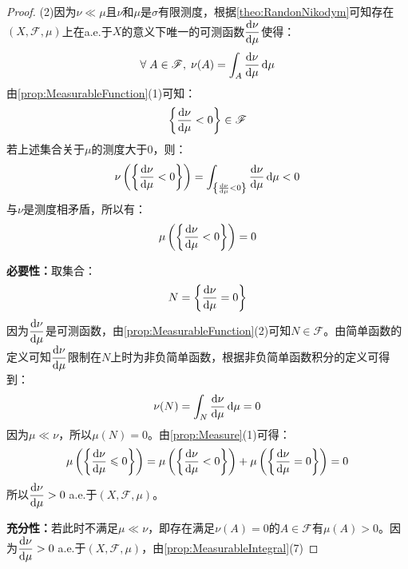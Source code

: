 \begin{proof}
	(2)因为$\nu\ll\mu$且$\nu$和$\mu$是$\sigma$有限测度，根据\cref{theo:RandonNikodym}可知存在$(X,\mathscr{F},\mu)$上在a.e.于$X$的意义下唯一的可测函数$\dfrac{\mathop{}\!\mathrm{d}\nu}{\mathop{}\!\mathrm{d}\mu}$使得：
	\begin{equation*}
		\forall\;A\in\mathscr{F},\;\nu(A)=\int_{A}\frac{\mathop{}\!\mathrm{d}\nu}{\mathop{}\!\mathrm{d}\mu}\mathop{}\!\mathrm{d}\mu
	\end{equation*}
	由\cref{prop:MeasurableFunction}(1)可知：
	\begin{equation*}
		\left\{\frac{\mathop{}\!\mathrm{d}\nu}{\mathop{}\!\mathrm{d}\mu}<0\right\}\in\mathscr{F}
	\end{equation*}
	若上述集合关于$\mu$的测度大于$0$，则：
	\begin{equation*}
		\nu\left(\left\{\frac{\mathop{}\!\mathrm{d}\nu}{\mathop{}\!\mathrm{d}\mu}<0\right\}\right)=\int_{\left\{\frac{\mathop{}\!\mathrm{d}\nu}{\mathop{}\!\mathrm{d}\mu}<0\right\}}\frac{\mathop{}\!\mathrm{d}\nu}{\mathop{}\!\mathrm{d}\mu}\mathop{}\!\mathrm{d}\mu<0
	\end{equation*}
	与$\nu$是测度相矛盾，所以有：
	\begin{equation*}
		\mu\left(\left\{\frac{\mathop{}\!\mathrm{d}\nu}{\mathop{}\!\mathrm{d}\mu}<0\right\}\right)=0
	\end{equation*}\par
	\textbf{必要性：}取集合：
	\begin{equation*}
		N=\left\{\frac{\mathop{}\!\mathrm{d}\nu}{\mathop{}\!\mathrm{d}\mu}=0\right\}
	\end{equation*}
	因为$\dfrac{\mathop{}\!\mathrm{d}\nu}{\mathop{}\!\mathrm{d}\mu}$是可测函数，由\cref{prop:MeasurableFunction}(2)可知$N\in\mathscr{F}$。由简单函数的定义可知$\dfrac{\mathop{}\!\mathrm{d}\nu}{\mathop{}\!\mathrm{d}\mu}$限制在$N$上时为非负简单函数，根据非负简单函数积分的定义可得到：
	\begin{equation*}
		\nu(N)=\int_{N}\frac{\mathop{}\!\mathrm{d}\nu}{\mathop{}\!\mathrm{d}\mu}\mathop{}\!\mathrm{d}\mu=0
	\end{equation*}
	因为$\mu\ll\nu$，所以$\mu(N)=0$。由\cref{prop:Measure}(1)可得：
	\begin{equation*}
		\mu\left(\left\{\dfrac{\mathop{}\!\mathrm{d}\nu}{\mathop{}\!\mathrm{d}\mu}\leqslant0\right\}\right)=\mu\left(\left\{\dfrac{\mathop{}\!\mathrm{d}\nu}{\mathop{}\!\mathrm{d}\mu}<0\right\}\right)+\mu\left(\left\{\dfrac{\mathop{}\!\mathrm{d}\nu}{\mathop{}\!\mathrm{d}\mu}=0\right\}\right)=0
	\end{equation*}
	所以$\dfrac{\mathop{}\!\mathrm{d}\nu}{\mathop{}\!\mathrm{d}\mu}>0\;$a.e.于$(X,\mathscr{F},\mu)$。\par
	\textbf{充分性：}若此时不满足$\mu\ll\nu$，即存在满足$\nu(A)=0$的$A\in\mathscr{F}$有$\mu(A)>0$。因为$\dfrac{\mathop{}\!\mathrm{d}\nu}{\mathop{}\!\mathrm{d}\mu}>0\;$a.e.于$(X,\mathscr{F},\mu)$，由\cref{prop:MeasurableIntegral}(7)
	

\end{proof}
